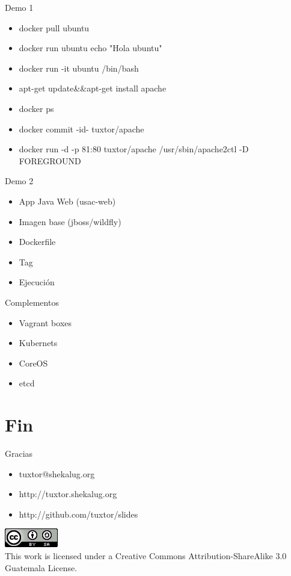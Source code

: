 \documentclass{beamer}
\begin{document}
\begin{frame}{Demo 1}
\begin{itemize}
\item docker pull ubuntu
\item docker run ubuntu echo "Hola ubuntu"
\item docker run -it ubuntu /bin/bash
\item apt-get update\&\&apt-get install apache
\item docker ps
\item docker commit -id- tuxtor/apache
\item docker run -d -p 81:80 tuxtor/apache /usr/sbin/apache2ctl -D FOREGROUND
\end{itemize}
\end{frame}

\begin{frame}{Demo 2}
\begin{itemize}
\item App Java Web (usac-web)
\item Imagen base (jboss/wildfly)
\item Dockerfile
\item Tag
\item Ejecución
\end{itemize}
\end{frame}

\begin{frame}{Complementos}
\begin{itemize}
\item Vagrant boxes
\item Kubernets
\item CoreOS
\item etcd
\end{itemize}
\end{frame}

\section{Fin}

\begin{frame}{Gracias}
\begin{itemize}
\item tuxtor@shekalug.org
\item http://tuxtor.shekalug.org
\item http://github.com/tuxtor/slides
\end{itemize}
\begin{center}
\includegraphics[width=0.1\linewidth]{Images/cclogo}
\\
This work is licensed under a Creative Commons Attribution-ShareAlike 3.0 Guatemala License.
\end{center}
\end{frame}
\end{document}
